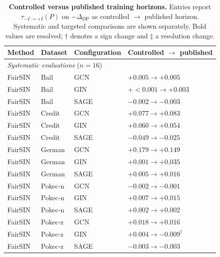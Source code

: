 \begin{table}[t]
\centering
\caption{
\textbf{Controlled versus published training horizons.}
Entries report
\(\tau_{-I\rightarrow +I}(P)\) on
\(-\Delta_{\mathrm{DP}}\) as
controlled \(\rightarrow\) published horizon.
Systematic and targeted comparisons are shown separately.
Bold values are resolved;
\(\dagger\) denotes a sign change and
\(\ddagger\) a resolution change.
}
\label{tab:native-horizon-pairs}
\vspace{-0.2cm}
\scriptsize
\setlength{\tabcolsep}{4pt}
\renewcommand{\arraystretch}{1.03}

\begin{tabular}{llll}
\toprule
Method & Dataset & Configuration & Controlled \(\rightarrow\) published \\
\midrule

\multicolumn{4}{l}{\textit{Systematic evaluations} (\(n=16\))} \\
\addlinespace[1pt]

FairSIN & Bail & GCN
& \(+0.005 \rightarrow +0.005\) \\
FairSIN & Bail & GIN
& \(+{<}0.001 \rightarrow +0.003\) \\
FairSIN & Bail & SAGE
& \(-0.002 \rightarrow -0.003\) \\

FairSIN & Credit & GCN
& \(\mathbf{+0.077} \rightarrow \mathbf{+0.083}\) \\
FairSIN & Credit & GIN
& \(\mathbf{+0.060} \rightarrow \mathbf{+0.054}\) \\
FairSIN & Credit & SAGE
& \(-0.049 \rightarrow -0.025\) \\

FairSIN & German & GCN
& \(\mathbf{+0.179} \rightarrow \mathbf{+0.149}\) \\
FairSIN & German & GIN
& \(+0.001 \rightarrow +0.035\) \\
FairSIN & German & SAGE
& \(+0.005 \rightarrow +0.016\) \\

FairSIN & Pokec-n & GCN
& \(-0.002 \rightarrow -0.001\) \\
FairSIN & Pokec-n & GIN
& \(+0.007 \rightarrow +0.015\) \\
FairSIN & Pokec-n & SAGE
& \(+0.002 \rightarrow +0.002\) \\

FairSIN & Pokec-z & GCN
& \(\mathbf{+0.018} \rightarrow \mathbf{+0.016}\) \\
FairSIN & Pokec-z & GIN
& \(+0.004 \rightarrow -0.009^{\dagger}\) \\
FairSIN & Pokec-z & SAGE
& \(-0.003 \rightarrow -0.003\) \\


\end{tabular}
\end{table}
